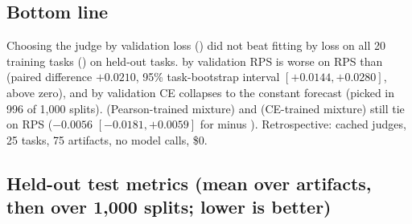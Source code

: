 
\subsection*{Bottom line}
Choosing the judge by validation loss () did not beat fitting by loss on all 20 training tasks () on held-out tasks.
 by validation RPS is worse on RPS than  (paired difference $+0.0210$, 95\% task-bootstrap interval $[+0.0144, +0.0280]$,
above zero), and  by validation CE collapses to the constant forecast (picked in 996 of 1,000 splits).
 (Pearson-trained mixture) and  (CE-trained mixture) still tie on RPS ($-0.0056$ $[-0.0181, +0.0059]$ for  minus ).
Retrospective: cached judges, 25 tasks, 75 artifacts, no model calls, \$0.

\subsection*{Held-out test metrics (mean over artifacts, then over 1,000 splits; lower is better)}
\begin{center}\small
{}
\end{center}

